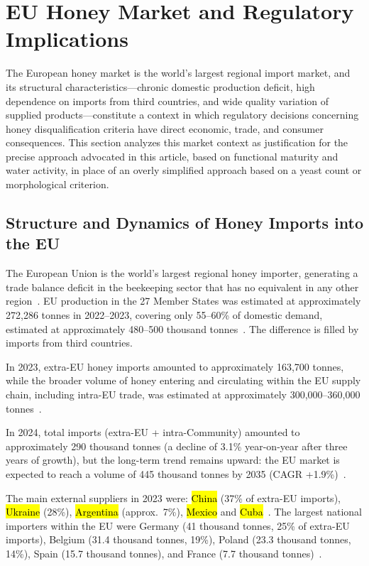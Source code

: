 \documentclass[foods,review,accept,pdftex,moreauthors]{Definitions/mdpi}
\begin{document}
{\section{EU Honey Market and Regulatory Implications}

The European honey market is the world's largest regional import
market, and its structural characteristics---chronic domestic
production deficit, high dependence on imports from third countries,
and wide quality variation of supplied products---constitute
a context in which regulatory decisions concerning honey
disqualification criteria have direct economic, trade, and consumer
consequences. This section analyzes this market context as
justification for the precise approach advocated in this article,
based on functional maturity and water activity, in place of an
overly simplified approach based on a yeast count or morphological
criterion.


\subsection{Structure and Dynamics of Honey Imports into the EU}


The European Union is the world's largest regional honey importer,
generating a trade balance deficit in the beekeeping sector that
has no equivalent in any other region~\cite{cbi2024,pollinatorhub2025}.
EU production in the 27 Member States was estimated at approximately 272,286 tonnes in 2022–2023, covering only 55–60\% of domestic demand, estimated at approximately 480--500 thousand tonnes~\cite{pollinatorhub2025,ec_honey_autumn2024}.
The difference is filled by imports from third countries.


In 2023, extra-EU honey imports amounted to approximately 163,700 tonnes, while the broader volume of honey entering and circulating within the EU supply chain, including intra-EU trade, was estimated at approximately 300,000–360,000 tonnes~\cite{cbi2024}.

In 2024, total imports (extra-EU + intra-Community) amounted to
approximately 290 thousand tonnes (a decline of 3.1\% year-on-year
after three years of growth), but the long-term trend remains
upward: the EU market is expected to reach a volume of 445 thousand
tonnes by 2035 (CAGR +1.9\%)~\cite{eurostat_honey2023}.

The main external suppliers in 2023 were: \hl{China} (37\% of extra-EU imports), \hl{Ukraine} (28\%),
\hl{Argentina} (approx.\ 7\%), \hl{Mexico} and
\hl{Cuba}~\cite{tridge2024}.
The largest national importers within the EU were Germany
(41 thousand tonnes, 25\% of extra-EU imports), Belgium
(31.4 thousand tonnes, 19\%), Poland (23.3 thousand tonnes, 14\%),
Spain (15.7 thousand tonnes), and France
(7.7 thousand tonnes)~\cite{eurostat_honey2023}.


}
\end{document}

